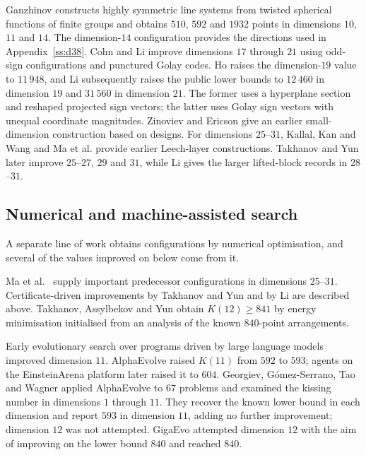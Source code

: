 \documentclass[11pt]{amsart}
\theoremstyle{remark}
\begin{document}
Ganzhinov \cite{ganzhinov2025} constructs highly symmetric line systems from
twisted spherical functions of finite groups and obtains $510$, $592$ and $1932$
points in dimensions $10$, $11$ and $14$. The dimension-$14$ configuration
provides the directions used in Appendix~\ref{ss:d38}. Cohn and Li
\cite{cohn-li2024} improve dimensions $17$ through $21$ using odd-sign
configurations and punctured Golay codes. Ho \cite{ho2026} raises the
dimension-$19$ value to $11\,948$, and Li \cite{kli19-21-2026} subsequently
raises the public lower bounds to $12\,460$ in dimension $19$ and $31\,560$ in
dimension $21$. The former uses a hyperplane section and reshaped projected
sign vectors; the latter uses Golay sign vectors with unequal coordinate
magnitudes.
Zinoviev and Ericson \cite{zinoviev-ericson1999} give an earlier small-dimension
construction based on designs. For dimensions $25$--$31$, Kallal, Kan and Wang
\cite{kallal-kan-wang2017} and Ma et al. \cite{ma-etal2025} provide earlier
Leech-layer constructions.
Takhanov and Yun \cite{takhanov-yun2026} later improve $25$--$27$, $29$ and
$31$, while Li \cite{kli28-31-2026} gives the larger lifted-block records in
$28$--$31$.

\subsection{Numerical and machine-assisted search}\label{ss:rw-search}

A separate line of work obtains configurations by numerical optimisation, and
several of the values improved on below come from it.

Ma et al.\ \cite{ma-etal2025} supply important predecessor configurations in
dimensions $25$--$31$. Certificate-driven improvements by Takhanov and Yun
and by Li are described above. Takhanov, Assylbekov and Yun
\cite{takhanov-assylbekov-yun2026} obtain $K(12)\ge841$ by energy minimisation
initialised from an analysis of the known $840$-point arrangements.

Early evolutionary search over programs driven by large language models
improved dimension $11$. AlphaEvolve \cite{novikov-etal2025} raised $K(11)$ from $592$ to
$593$; agents on the EinsteinArena platform \cite{bianchi-kwon-pappu-zou2026} later
raised it to $604$. Georgiev, G\'omez-Serrano, Tao and Wagner
\cite{georgiev-gomezserrano-tao-wagner2025} applied AlphaEvolve to $67$ problems
and examined the kissing number in dimensions $1$ through $11$. They recover the
known lower bound in each dimension and report $593$ in dimension $11$, adding no
further improvement; dimension $12$ was not attempted. GigaEvo
\cite{khrulkov-etal2025} attempted dimension $12$ with the aim of improving on the
lower bound $840$ and reached $840$.
\end{document}
